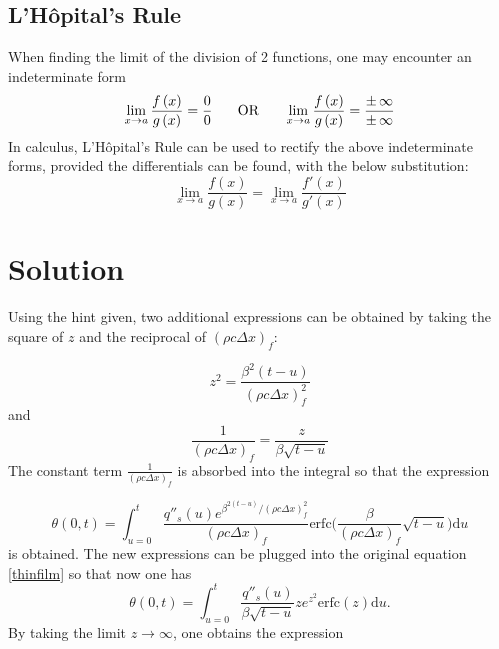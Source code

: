 \documentclass{article}
\begin{document}
\subsection*{L'Hôpital's Rule}
When finding the limit of the division of 2 functions, one may encounter an indeterminate form
\begin{equation*}
    \mathop {\lim }\limits_{x \to a} \frac{{f\left( x \right)}}{{g\left( x \right)}} = \frac{0}{0}\hspace{0.25in}{\mbox{OR}}\hspace{0.25in}\mathop {\lim }\limits_{x \to a} \frac{{f\left( x \right)}}{{g\left( x \right)}} = \frac{{ \pm \,\infty }}{{ \pm \,\infty }}
\end{equation*}
In calculus, L'Hôpital's Rule can be used to rectify the above indeterminate forms, provided the differentials can be found, with the below substitution:
\begin{equation*}
    \mathop {\lim }\limits_{x \to a} \frac{{f\left( x \right)}}{{g\left( x \right)}} = \mathop {\lim }\limits_{x \to a} \frac{{f'\left( x \right)}}{{g'\left( x \right)}}
\end{equation*}

\section{Solution}

Using the hint given, two additional expressions can be obtained by taking the square of $ z $ and the reciprocal of $(\rho c \Delta x)_f$:

\begin{equation}
    z^2=\frac{\beta^2(t-u)}{(\rho c \Delta x)^2_f}
\end{equation}
and
\begin{equation}
    \frac{1}{(\rho c \Delta x)_f}=\frac{z}{\beta\sqrt{{t-u}}}
\end{equation}
The constant term $\frac{1}{(\rho c \Delta x)_f}$ is absorbed into the integral so that the expression 

\begin{equation}
  \theta(0,t) =\int_{u=0}^t\frac{q''_s(u)e^{\beta^{2(t-u)}/(\rho c \Delta x)^{2}_f}}{(\rho c \Delta x)_f} \text{erfc}\bigg(\frac{\beta}{(\rho c \Delta x)_f} \sqrt{t-u}\bigg)\text{d}u
\end{equation}
is obtained. The new expressions can be plugged into the original equation  \eqref{thinfilm} so that now one has
\begin{equation}
   \theta(0,t)=\int_{u=0}^t\frac{q''_s(u)}{\beta\sqrt{t-u}}ze^{z^2}\text{erfc}(z)\text{d}u.
\end{equation}
By taking the limit $z \rightarrow \infty$, one obtains the expression
\end{document}
